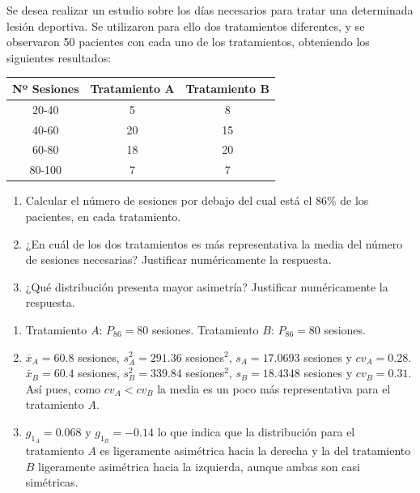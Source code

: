 {Se desea realizar un estudio sobre los días necesarios para tratar una determinada lesión deportiva.
Se utilizaron para ello dos tratamientos diferentes, y se observaron 50 pacientes con cada uno de los tratamientos, obteniendo los siguientes resultados:
\begin{center}
\begin{tabular}{|c|c|c|}
\hline
Nº Sesiones & Tratamiento A & Tratamiento B \\
\hline
20-40 & 5 & 8  \\
\hline
40-60 & 20 & 15  \\
\hline
60-80 & 18 & 20  \\
\hline
80-100 & 7 & 7  \\
\hline
\end{tabular}
\end{center}
\begin{enumerate}
\item Calcular el número de sesiones por debajo del cual está el 86\% de los pacientes, en cada tratamiento.
\item ¿En cuál de los dos tratamientos es más representativa la media del número de sesiones necesarias?
Justificar numéricamente la respuesta.
\item ¿Qué distribución presenta mayor asimetría?
Justificar numéricamente la respuesta.
\end{enumerate}
}
{\begin{enumerate}
\item Tratamiento $A$: $P_{86} = 80$ sesiones. Tratamiento $B$: $P_{86}=80$ sesiones.
\item $\bar x_A=60.8$ sesiones, $s^2_A=291.36$ sesiones$^2$, $s_A=17.0693$ sesiones y $cv_A = 0.28$.\\
$\bar x_B=60.4$ sesiones, $s^2_B= 339.84$ sesiones$^2$, $s_B=18.4348$ sesiones y $cv_B = 0.31$.\\
Así pues, como $cv_A<cv_B$ la media es un poco más representativa para el tratamiento $A$. 
\item $g_{1_A} = 0.068$ y $g_{1_B} = -0.14$ lo que indica que la distribución para el tratamiento $A$ es ligeramente asimétrica hacia la derecha y la del tratamiento $B$ ligeramente asimétrica hacia la izquierda, aunque ambas son casi simétricas. 
\end{enumerate}
}
{}


